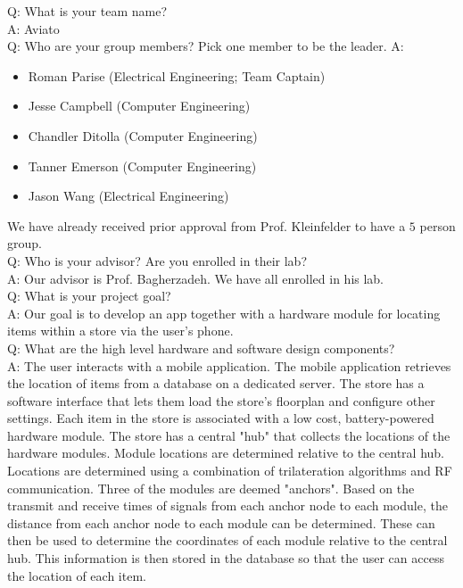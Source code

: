 \documentclass{article}
\begin{document}
Q: What is your team name? \\
A: Aviato \\
Q: Who are your group members? Pick one member to be the leader.
A: \\
\begin{itemize}
\item Roman Parise (Electrical Engineering; Team Captain)
\item Jesse Campbell (Computer Engineering)
\item Chandler Ditolla (Computer Engineering)
\item Tanner Emerson (Computer Engineering)
\item Jason Wang (Electrical Engineering)
\end{itemize}
We have already received prior approval from Prof. Kleinfelder to have a $5$ person group.
\\
Q: Who is your advisor? Are you enrolled in their lab? \\
A: Our advisor is Prof. Bagherzadeh. We have all enrolled in his lab.
\\
Q: What is your project goal? \\
A: Our goal is to develop an app together with a hardware module for locating items within a store via the user's phone.
\\
Q: What are the high level hardware and software design components? \\
A: The user interacts with a mobile application. The mobile application retrieves the location of items from a database on a dedicated server. The store has a software interface that lets them load the store's floorplan and configure other settings. Each item in the store is associated with a low cost, battery-powered hardware module. The store has a central "hub" that collects the locations of the hardware modules. Module locations are determined relative to the central hub. \\
Locations are determined using a combination of trilateration algorithms and RF communication. Three of the modules are deemed "anchors". Based on the transmit and receive times of signals from each anchor node to each module, the distance from each anchor node to each module can be determined. These can then be used to determine the coordinates of each module relative to the central hub. This information is then stored in the database so that the user can access the location of each item.
\end{document}
